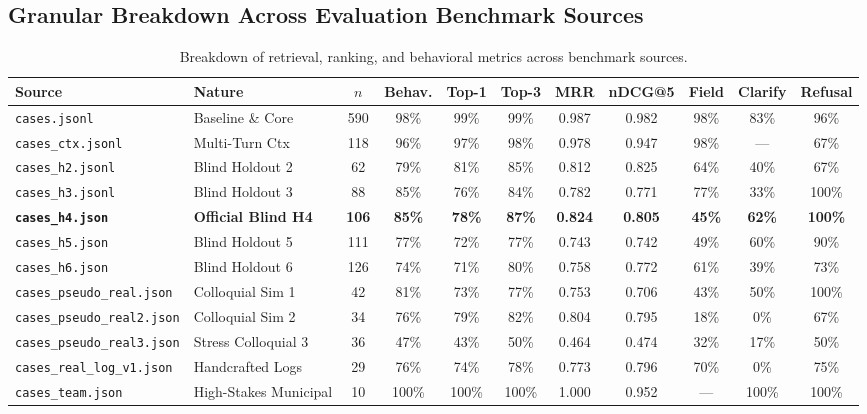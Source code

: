 \documentclass[11pt,a4paper]{article}
\begin{document}
\subsection{Granular Breakdown Across Evaluation Benchmark Sources}
\begin{table}[htbp]
\centering
\caption{Breakdown of retrieval, ranking, and behavioral metrics across benchmark sources.}
\label{tab:sources}
\footnotesize
\begin{adjustbox}{max width=\textwidth}
\begin{tabular}{@{}llccccccccc@{}}
\toprule
\textbf{Source} & \textbf{Nature} & \textbf{$n$} & \textbf{Behav.} & \textbf{Top-1} & \textbf{Top-3} &
\textbf{MRR} & \textbf{nDCG@5} & \textbf{Field} & \textbf{Clarify} & \textbf{Refusal}\\
\midrule
\texttt{cases.jsonl} & Baseline \& Core & 590 & 98\% & 99\% & 99\% & 0.987 & 0.982 & 98\% & 83\% & 96\%\\
\texttt{cases\_ctx.jsonl} & Multi-Turn Ctx & 118 & 96\% & 97\% & 98\% & 0.978 & 0.947 & 98\% & --- & 67\%\\
\texttt{cases\_h2.jsonl} & Blind Holdout 2 & 62 & 79\% & 81\% & 85\% & 0.812 & 0.825 & 64\% & 40\% & 67\%\\
\texttt{cases\_h3.jsonl} & Blind Holdout 3 & 88 & 85\% & 76\% & 84\% & 0.782 & 0.771 & 77\% & 33\% & 100\%\\
\textbf{\texttt{cases\_h4.json}} & \textbf{Official Blind H4} & \textbf{106} & \textbf{85\%} &
\textbf{78\%} & \textbf{87\%} & \textbf{0.824} & \textbf{0.805} & \textbf{45\%} & \textbf{62\%} &
\textbf{100\%}\\
\texttt{cases\_h5.json} & Blind Holdout 5 & 111 & 77\% & 72\% & 77\% & 0.743 & 0.742 & 49\% & 60\% & 90\%\\
\texttt{cases\_h6.json} & Blind Holdout 6 & 126 & 74\% & 71\% & 80\% & 0.758 & 0.772 & 61\% & 39\% & 73\%\\
\texttt{cases\_pseudo\_real.json} & Colloquial Sim 1 & 42 & 81\% & 73\% & 77\% & 0.753 & 0.706 & 43\% & 50\% & 100\%\\
\texttt{cases\_pseudo\_real2.json} & Colloquial Sim 2 & 34 & 76\% & 79\% & 82\% & 0.804 & 0.795 & 18\% & 0\% & 67\%\\
\texttt{cases\_pseudo\_real3.json} & Stress Colloquial 3 & 36 & 47\% & 43\% & 50\% & 0.464 & 0.474 & 32\% & 17\% & 50\%\\
\texttt{cases\_real\_log\_v1.json} & Handcrafted Logs & 29 & 76\% & 74\% & 78\% & 0.773 & 0.796 & 70\% & 0\% & 75\%\\
\texttt{cases\_team.json} & High-Stakes Municipal & 10 & 100\% & 100\% & 100\% & 1.000 & 0.952 & --- & 100\% & 100\%\\
\bottomrule
\end{tabular}
\end{adjustbox}
\end{table}
\end{document}
